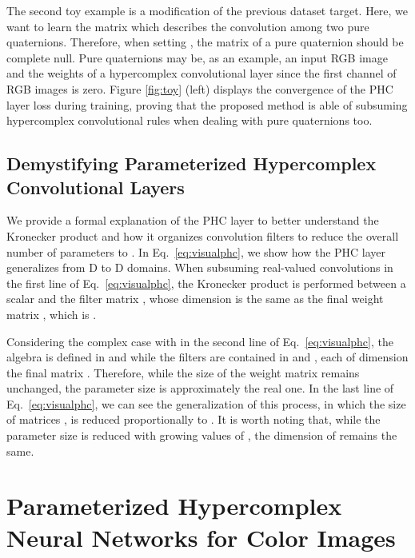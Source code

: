 \documentclass[lettersize,journal]{IEEEtran}
\begin{document}
The second toy example is a modification of the previous dataset target. Here, we want to learn the matrix  which describes the convolution among two pure quaternions. Therefore, when setting , the matrix  of a pure quaternion should be complete null. Pure quaternions may be, as an example, an input RGB image and the weights of a hypercomplex convolutional layer since the first channel of RGB images is zero. Figure \ref{fig:toy} (left) displays the convergence of the PHC layer loss during training, proving that the proposed method is able of subsuming hypercomplex convolutional rules when dealing with pure quaternions too.



\begin{strip}

\end{strip}



\subsection{Demystifying Parameterized Hypercomplex Convolutional Layers}
\label{subsec:dem_phc}

We provide a formal explanation of the PHC layer to better understand the Kronecker product and how it organizes convolution filters to reduce the overall number of parameters to . In Eq.~\ref{eq:visualphc}, we show how the PHC layer generalizes from D to D domains. When subsuming real-valued convolutions in the first line of Eq.~\ref{eq:visualphc}, the Kronecker product is performed between a scalar  and the filter matrix , whose dimension is the same as the final weight matrix , which is .

Considering the complex case with  in the second line of Eq.~\ref{eq:visualphc}, the algebra is defined in  and  while the filters are contained in  and , each of dimension  the final matrix .
Therefore, while the size of the weight matrix  remains unchanged, the parameter size is approximately  the real one. In the last line of Eq.~\ref{eq:visualphc}, we can see the generalization of this process, in which the size of matrices ,  is reduced proportionally to . It is worth noting that, while the parameter size is reduced with growing values of , the dimension of  remains the same.






\section{Parameterized Hypercomplex Neural Networks for Color Images}
\label{sec:phc_rgb}
\end{document}
